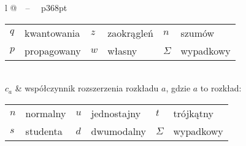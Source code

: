 \begin{longtable}[l]{ l @{~~--~~} p{368pt} }
\begin{tabular}{ *{3}{l @{~--~} l} }
                                  $q$ & kwantowania & $z$      & zaokrągleń & $n$      & szumów     \\
                                  $p$ & propagowany & $w$      & własny     & $\Sigma$ & wypadkowy
                                  \end{tabular} \\
$c_{a}$                         & współczynnik rozszerzenia rozkładu $a$, gdzie $a$ to rozkład: \newline
                                  \begin{tabular}{ *{3}{l @{~--~} l} }
                                  $n$ & normalny    & $u$      & jednostajny & $t$      & trójkątny  \\
                                  $s$ & studenta    & $d$      & dwumodalny  & $\Sigma$ & wypadkowy
                                  \end{tabular} \\
\end{longtable}

